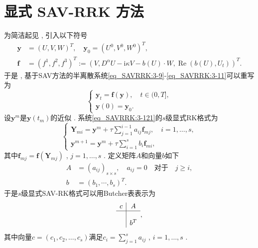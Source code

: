 \section{显式 SAV-RRK 方法}\label{Section_SAVRRK: 4}

为简洁起见 , 引入以下符号
\begin{equation}
	\begin{aligned}
		\bm{y}&=\left(U , V , W\right)^T , \quad\bm{y}_0=\left(U^0 , V^0 , W^0\right)^T  , \\
		\bm{f}&=(f^1 , f^2 , f^3)^T:=(V , D^{\alpha} U-\mathrm{i}\kappa V-b(U)\cdot W , \operatorname{Re}\left(b(U) , U_t\right))^T . 
	\end{aligned}
\end{equation}
于是 , 基于SAV方法的半离散系统\eqref{eq_SAVRRK:3-9}-\eqref{eq_SAVRRK:3-11}可以重写为
\begin{equation}
\left\{\begin{array}{l}
\bm{y}_t=\bm{f}(\bm{y}) , \quad t \in(0 , T] , \\
\bm{y}(0)=\bm{y}_0 . 
\end{array}\right . \label{eq_SAVRRK:3-121}
\end{equation}
设$\bm{y}^m$是$\bm{y}\left(t_m\right)$的近似 . 系统\eqref{eq_SAVRRK:3-121}的$s$级显式RK格式\cite{hairerRungeKuttaMethods2015}为
\begin{equation}
\left\{\begin{array}{l}
\bm{Y}_{m i}=\bm{y}^m+\tau \sum\limits_{j=1}^{i-1} a_{i j} \bm{f}_{m j} , \quad i=1 , \ldots , s , \\
\bm{y}^{m+1}=\bm{y}^m+\tau \sum\limits_{i=1}^s b_i \bm{f}_{m i} , 
\end{array}\right . \label{eq_SAVRRK:4-31}
\end{equation}
其中$\bm{f}_{m j}=\bm{f}\left(\bm{Y}_{m j}\right)$ , $j=1 , \ldots , s$ . 
定义矩阵$A$和向量$b$如下
\begin{equation}
\begin{aligned}
A & =\left(a_{i j}\right)_{s \times s} , \quad a_{i j}=0 \quad \text {对于} \quad j \geq i , \\
b & =\left(b_1 , \cdots , b_s\right)^T . 
\end{aligned}
\end{equation}
于是$s$级显式SAV-RK格式可以用Butcher表表示为
\begin{equation}
\begin{array}{c|c}
c & A \\
\hline \\
& b^T
\end{array} , 
\end{equation}
其中向量$c=(c_1 , c_2 , \dots , c_s)$满足$c_i=\sum\limits_{j=1}^s a_{i j}$ , $i=1 , \ldots , s$ . 

